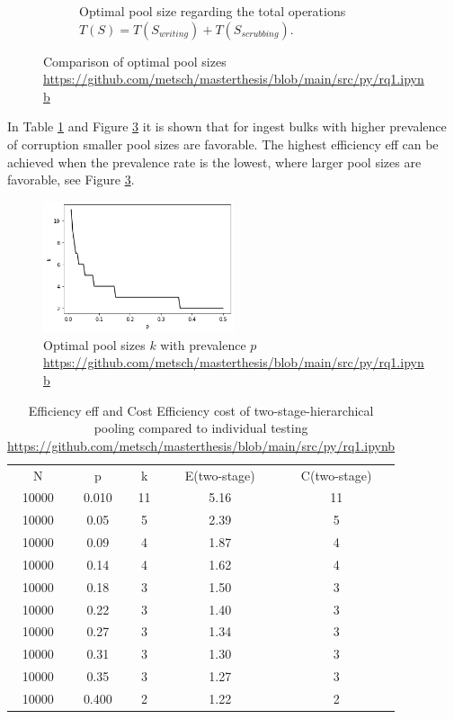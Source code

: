 \begin{figure}[H]
\begin{subfigure}{6cm}
        \caption{Optimal pool size regarding the total operations $T(S) = T(S_{writing}) + T(S_{scrubbing})$.}\label{fig:expected_operations}
    \end{subfigure}
    \caption{Comparison of optimal pool sizes \url{https://github.com/metsch/masterthesis/blob/main/src/py/rq1.ipynb}}%
    \label{fig:optimal_pool_size}%
\end{figure}
In Table \ref{tb:expected costs} and Figure \ref{fig:poolsizes} it is shown that for ingest bulks with higher prevalence of corruption smaller pool sizes are favorable.
The highest efficiency \acrshort{eff} can be achieved when the prevalence rate is the lowest, where larger pool sizes are favorable, see Figure \ref{fig:poolsizes}.
\begin{figure}[H]%
    \centering
    \caption{Optimal pool sizes $k$ with prevalence $p$ \url{https://github.com/metsch/masterthesis/blob/main/src/py/rq1.ipynb}}\label{fig:pool-sizes}
    \label{fig:poolsizes}
    \includegraphics[width=0.5\textwidth]{graphics/poolsizes.png}
\end{figure}
\begin{table}[H]
    \caption{Efficiency \acrshort{eff} and Cost Efficiency \acrshort{cost} of two-stage-hierarchical pooling compared to individual testing \url{https://github.com/metsch/masterthesis/blob/main/src/py/rq1.ipynb}}
    \centering
    \begin{tabular}{ c c c c c}
    \label{tb:expected costs}
     N & p & k & E(\acrshort{two-stage}) & C(\acrshort{two-stage}) \\
     10000 & 0.010 & 11 & 5.16 & 11 \\ 
     \hline
     10000 & 0.05 & 5 & 2.39 & 5 \\  
     \hline
     10000 & 0.09 & 4 & 1.87 & 4 \\  
     \hline
     10000 & 0.14 & 4 & 1.62 & 4 \\  
     \hline
     10000 & 0.18 & 3 & 1.50 & 3  \\
     \hline
     10000 & 0.22 & 3 & 1.40 & 3  \\
     \hline
     10000 & 0.27 & 3 & 1.34 & 3  \\
     \hline
     10000 & 0.31 & 3 & 1.30 & 3  \\
     \hline
     10000 & 0.35 & 3 & 1.27 & 3  \\
     \hline
     10000 & 0.400 & 2 & 1.22 & 2  
    \end{tabular}
\end{table}

